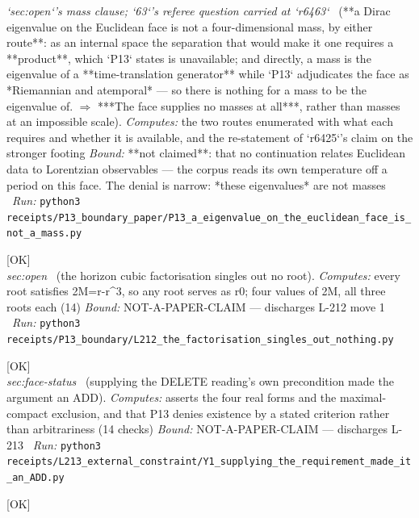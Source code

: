 \begin{description}
\textit{`sec:open`'s mass clause; `63`'s referee question carried at `r6463`} \ (**a Dirac eigenvalue on the Euclidean face is not a four-dimensional mass, by either route**: as an internal space the separation that would make it one requires a **product**, which `P13` states is unavailable; and directly, a mass is the eigenvalue of a **time-translation generator** while `P13` adjudicates the face as *Riemannian and atemporal* --- so there is nothing for a mass to be the eigenvalue of. \ensuremath{\Rightarrow} ***The face supplies no masses at all***, rather than masses at an impossible scale). 
\emph{Computes:} the two routes enumerated with what each requires and whether it is available, and the re-statement of `r6425`'s claim on the stronger footing
 \emph{Bound:} **not claimed**: that no continuation relates Euclidean data to Lorentzian observables --- the corpus reads its own temperature off a period on this face. The denial is narrow: *these eigenvalues* are not masses
\ \emph{Run:} \texttt{python3 receipts/P13\_boundary\_paper/P13\_a\_eigenvalue\_on\_the\_euclidean\_face\_is\_not\_a\_mass.py}
\item[\rcptlabel{L212_the_factorisation_singles_out_nothing}{P13R17}\textbf{P13R17}\quad\texttt{L212\_the\_factorisation\_singles\_out\_nothing}]\hfill\textsf{[OK]}\\
\textit{sec:open} \ (the horizon cubic factorisation singles out no root). 
\emph{Computes:} every root satisfies 2M=r-r\textasciicircum{}3, so any root serves as r0; four values of 2M, all three roots each (14)
 \emph{Bound:} NOT-A-PAPER-CLAIM --- discharges L-212 move 1
\ \emph{Run:} \texttt{python3 receipts/P13\_boundary/L212\_the\_factorisation\_singles\_out\_nothing.py}
\item[\label{rcpt:Y1_supplying_the_requirement_made_it_an_ADD}\textbf{}\quad\texttt{Y1\_supplying\_the\_requirement\_made\_it\_an\_ADD}]\hfill\textsf{[OK]}\\
\textit{sec:face-status} \ (supplying the DELETE reading's own precondition made the argument an ADD). 
\emph{Computes:} asserts the four real forms and the maximal-compact exclusion, and that P13 denies existence by a stated criterion rather than arbitrariness (14 checks)
 \emph{Bound:} NOT-A-PAPER-CLAIM --- discharges L-213
\ \emph{Run:} \texttt{python3 receipts/L213\_external\_constraint/Y1\_supplying\_the\_requirement\_made\_it\_an\_ADD.py}
\item[\label{rcpt:A1_the_venue_question_dissolves_and_curvature_remains}\textbf{}\quad\texttt{A1\_the\_venue\_question\_dissolves\_and\_curvature\_remains}]\hfill\textsf{[OK]}\\

\end{description}
